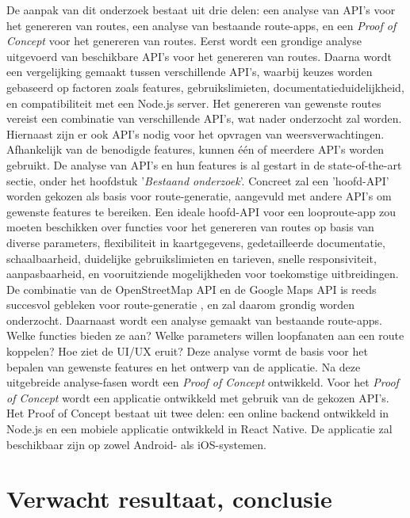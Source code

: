 De aanpak van dit onderzoek bestaat uit drie delen: een analyse van API's voor het genereren van routes, een analyse van bestaande route-apps, en een \emph{Proof of Concept} voor het genereren van routes.
Eerst wordt een grondige analyse uitgevoerd van beschikbare API's voor het genereren van routes.
Daarna wordt een vergelijking gemaakt tussen verschillende API's,
waarbij keuzes worden gebaseerd op factoren zoals features, gebruikslimieten,
documentatieduidelijkheid, en compatibiliteit met een Node.js server.
Het genereren van gewenste routes vereist een combinatie van verschillende API's,
wat nader onderzocht zal worden. Hiernaast zijn er ook API's nodig voor het opvragen van weersverwachtingen.
Afhankelijk van de benodigde features, kunnen één of meerdere API's worden gebruikt.
De analyse van API's en hun features is al gestart in de state-of-the-art sectie,
onder het hoofdstuk '\emph{Bestaand onderzoek}'.
Concreet zal een 'hoofd-API' worden gekozen als basis voor route-generatie,
aangevuld met andere API's om gewenste features te bereiken.
Een ideale hoofd-API voor een looproute-app zou moeten beschikken
over functies voor het genereren van routes op basis van diverse parameters, flexibiliteit in kaartgegevens,
gedetailleerde documentatie, schaalbaarheid, duidelijke gebruikslimieten en tarieven, snelle responsiviteit,
aanpasbaarheid, en vooruitziende mogelijkheden voor toekomstige uitbreidingen.
De combinatie van de OpenStreetMap API en de Google Maps API is reeds succesvol gebleken voor route-generatie \autocite{Loepp2018},
en zal daarom grondig worden onderzocht.
Daarnaast wordt een analyse gemaakt van bestaande route-apps.
Welke functies bieden ze aan? Welke parameters willen loopfanaten aan een route koppelen? Hoe ziet de UI/UX eruit?
Deze analyse vormt de basis voor het bepalen van gewenste features en het ontwerp van de applicatie.
Na deze uitgebreide analyse-fasen wordt een \emph{Proof of Concept} ontwikkeld.
Voor het \emph{Proof of Concept} wordt een applicatie ontwikkeld met gebruik van de gekozen API's.
Het Proof of Concept bestaat uit twee delen: een online backend ontwikkeld in Node.js
en een mobiele applicatie ontwikkeld in React Native. De applicatie zal beschikbaar zijn op zowel Android- als iOS-systemen.

\section{Verwacht resultaat, conclusie}%
\label{sec:verwachte_resultaten}

